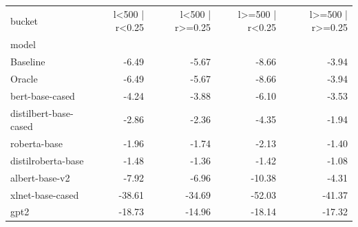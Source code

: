 \begin{tabular}{lrrrr}
\toprule
bucket & l<500 | r<0.25 & l<500 | r>=0.25 & l>=500 | r<0.25 & l>=500 | r>=0.25 \\
model &  &  &  &  \\
\midrule
Baseline & -6.49 & -5.67 & -8.66 & -3.94 \\
Oracle & -6.49 & -5.67 & -8.66 & -3.94 \\
bert-base-cased & -4.24 & -3.88 & -6.10 & -3.53 \\
distilbert-base-cased & -2.86 & -2.36 & -4.35 & -1.94 \\
roberta-base & -1.96 & -1.74 & -2.13 & -1.40 \\
distilroberta-base & -1.48 & -1.36 & -1.42 & -1.08 \\
albert-base-v2 & -7.92 & -6.96 & -10.38 & -4.31 \\
xlnet-base-cased & -38.61 & -34.69 & -52.03 & -41.37 \\
gpt2 & -18.73 & -14.96 & -18.14 & -17.32 \\
\bottomrule
\end{tabular}
